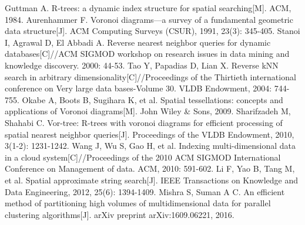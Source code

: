 \documentclass{ML}
\begin{document}
\begin{thebibliography}{20}
     Guttman A. R-trees: a dynamic index structure for spatial searching[M]. ACM, 1984.
     Aurenhammer F. Voronoi diagrams—a survey of a fundamental geometric data structure[J]. ACM Computing Surveys (CSUR), 1991, 23(3): 345-405.
     Stanoi I, Agrawal D, El Abbadi A. Reverse nearest neighbor queries for dynamic databases[C]//ACM SIGMOD workshop on research issues in data mining and knowledge discovery. 2000: 44-53.
     Tao Y, Papadias D, Lian X. Reverse kNN search in arbitrary dimensionality[C]//Proceedings of the Thirtieth international conference on Very large data bases-Volume 30. VLDB Endowment, 2004: 744-755.
     Okabe A, Boots B, Sugihara K, et al. Spatial tessellations: concepts and applications of Voronoi diagrams[M]. John Wiley \& Sons, 2009.
     Sharifzadeh M, Shahabi C. Vor-tree: R-trees with voronoi diagrams for efficient processing of spatial nearest neighbor queries[J]. Proceedings of the VLDB Endowment, 2010, 3(1-2): 1231-1242.
     Wang J, Wu S, Gao H, et al. Indexing multi-dimensional data in a cloud system[C]//Proceedings of the 2010 ACM SIGMOD International Conference on Management of data. ACM, 2010: 591-602.
     Li F, Yao B, Tang M, et al. Spatial approximate string search[J]. IEEE Transactions on Knowledge and Data Engineering, 2012, 25(6): 1394-1409.
     Mishra S, Suman A C. An efficient method of partitioning high volumes of multidimensional data for parallel clustering algorithms[J]. arXiv preprint arXiv:1609.06221, 2016.
\end{thebibliography}
\end{document}
